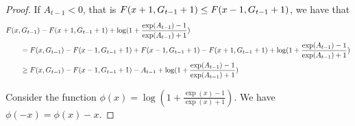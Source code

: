 \begin{proof}
If $A_{t-1}<0$, that is $F(x+1,G_{t-1}+1) \leq F(x-1,G_{t-1}+1)$, we have that 
\begin{align*}
&F(x,G_{t-1}) - F(x+1,G_{t-1}+1) + \log(1+\frac{\exp(A_{t-1})-1}{\exp(A_{t-1})+1})\\
&\qquad = F(x,G_{t-1}) - F(x-1,G_{t-1}+1) + F(x-1,G_{t-1}+1) - F(x+1,G_{t-1}+1) + \log(1+\frac{\exp(A_{t-1})-1}{\exp(A_{t-1})+1})\\
&\qquad \geq F(x,G_{t-1}) - F(x-1,G_{t-1}+1) -A_{t-1} + \log(1+\frac{\exp(A_{t-1})-1}{\exp(A_{t-1})+1})\\
\end{align*}

Consider the function $\phi(x)=\log(1+\frac{\exp(x)-1}{\exp(x)+1})$. We have $\phi(-x)=\phi(x)-x$.


\end{proof}